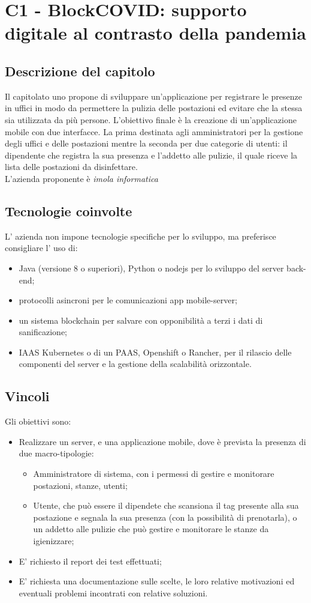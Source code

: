 \section{C1 - BlockCOVID: supporto digitale al contrasto della pandemia}
\subsection{Descrizione del capitolo}
Il capitolato uno propone di sviluppare un'applicazione per registrare le presenze in uffici in modo da permettere la pulizia delle postazioni ed evitare che la stessa sia utilizzata da più persone.
L'obiettivo finale è la creazione di un'applicazione mobile con due interfacce. La prima destinata agli amministratori per la gestione degli uffici e delle postazioni mentre la seconda per due categorie di utenti: il dipendente che registra la sua presenza e l'addetto alle pulizie, il quale riceve la lista delle postazioni da disinfettare.\\
L'azienda proponente è \textit{imola informatica}

\subsection{Tecnologie coinvolte}
L' azienda non impone tecnologie specifiche per lo sviluppo, ma preferisce consigliare l' uso di:
\begin{itemize}
\item	Java (versione 8 o superiori), Python o nodejs per lo sviluppo del server back-end;
\item	protocolli asincroni per le comunicazioni app mobile-server;
\item	un sistema blockchain per salvare con opponibilità a terzi i dati di sanificazione;
\item	IAAS Kubernetes o di un PAAS, Openshift o Rancher, per il rilascio delle componenti del server e la gestione della scalabilità orizzontale.
\end{itemize}

\subsection{Vincoli}
Gli obiettivi sono:
\begin{itemize}
\item	Realizzare un server, e una applicazione mobile, dove è prevista la presenza di due macro-tipologie:
\begin{itemize}
\item	Amministratore di sistema, con i permessi di gestire e monitorare postazioni, stanze, utenti;
\item	Utente, che può essere il dipendete che scansiona il tag presente alla sua postazione e segnala la sua presenza (con la possibilità di prenotarla), o un addetto alle pulizie che può gestire e monitorare le stanze da igienizzare;
\end{itemize}
\item	E' richiesto il report dei test effettuati;
\item	E' richiesta una documentazione sulle scelte, le loro relative motivazioni ed eventuali problemi incontrati con relative soluzioni.
\end{itemize}

